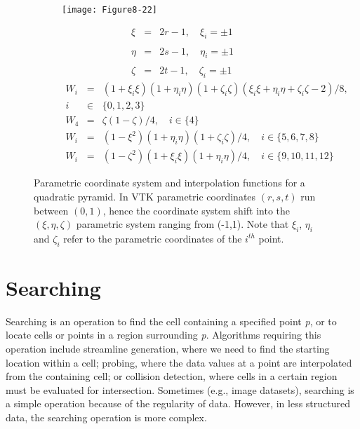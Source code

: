 \begin{figure}[!htb]
	\centering
	\begin{subfigure}{0.48\linewidth}
		\centering
		\texttt{[image: Figure8-22]}
		\caption*{}
	\end{subfigure}
	\hfill
	\begin{subfigure}{0.48\linewidth}
		\centering
		\begin{equation*}
		\begin{array}{lll}
		\xi &=& 2 r - 1, \quad \xi_i = \pm1 \\ \\
		\eta &=& 2 s - 1, \quad \eta_i = \pm1 \\ \\
		\zeta &=& 2 t - 1, \quad \zeta_i = \pm1
		\end{array}
		\end{equation*}
		\begin{equation*}
		\begin{array}{lll}
		W_i &=& (1 + \xi_i \xi)(1 + \eta_i \eta)(1 + \zeta_i \zeta)(\xi_i \xi + \eta_i \eta + \zeta_i \zeta - 2)/8, \\
		i &\in& \lbrace 0, 1, 2, 3 \rbrace \\
		W_4 &=& \zeta(1 - \zeta)/4, \quad i \in \lbrace 4 \rbrace \\
		W_i &=& (1 - \xi^2)(1 + \eta_i \eta)(1 + \zeta_i \zeta)/4, \quad i \in \lbrace 5, 6, 7, 8\rbrace \\
		W_i &=& (1 - \zeta^2)(1 + \xi_i \xi)(1 + \eta_i \eta)/4, \quad i \in \lbrace 9, 10, 11, 12 \rbrace	
		\end{array}
		\end{equation*}
	\end{subfigure}%
	\caption{Parametric coordinate system and interpolation functions for a quadratic pyramid. In VTK parametric coordinates $(r,s,t)$ run between $(0,1)$, hence the coordinate system shift into the $(\xi, \eta, \zeta)$ parametric system ranging from (-1,1). Note that $\xi_i$, $\eta_i$ and $\zeta_i$ refer to the parametric coordinates of the $i^{th}$ point.}
	\label{fig:Figure8-22}
\end{figure}


\section{Searching}
\label{sec:searching}
Searching is an operation to find the cell containing a specified point \emph{p}, or to locate cells or points in a region surrounding \emph{p}.
Algorithms requiring this operation include streamline generation, where we need to find the starting location within a cell; probing, where the data values at a point are interpolated from the containing cell; or collision detection, where cells in a certain region must be evaluated for intersection.
Sometimes (e.g., image datasets), searching is a simple operation because of the regularity of data. However, in less structured data, the searching operation is more complex.

